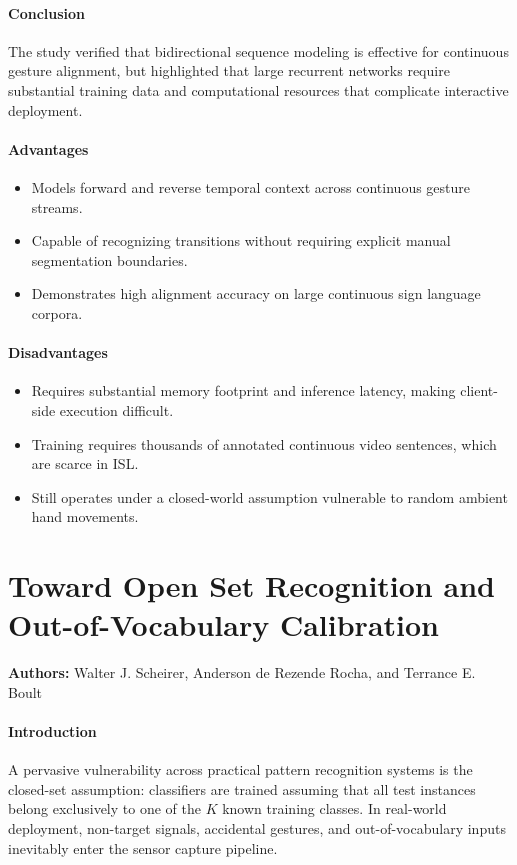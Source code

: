 \paragraph{Conclusion}
The study verified that bidirectional sequence modeling is effective for continuous gesture alignment, but highlighted that large recurrent networks require substantial training data and computational resources that complicate interactive deployment.

\paragraph{Advantages}
\begin{itemize}
    \item Models forward and reverse temporal context across continuous gesture streams.
    \item Capable of recognizing transitions without requiring explicit manual segmentation boundaries.
    \item Demonstrates high alignment accuracy on large continuous sign language corpora.
\end{itemize}

\paragraph{Disadvantages}
\begin{itemize}
    \item Requires substantial memory footprint and inference latency, making client-side execution difficult.
    \item Training requires thousands of annotated continuous video sentences, which are scarce in ISL.
    \item Still operates under a closed-world assumption vulnerable to random ambient hand movements.
\end{itemize}

\section{Toward Open Set Recognition and Out-of-Vocabulary Calibration}
\textbf{Authors:} Walter J. Scheirer, Anderson de Rezende Rocha, and Terrance E. Boult \cite{11,12}

\paragraph{Introduction}
A pervasive vulnerability across practical pattern recognition systems is the closed-set assumption: classifiers are trained assuming that all test instances belong exclusively to one of the $K$ known training classes. In real-world deployment, non-target signals, accidental gestures, and out-of-vocabulary inputs inevitably enter the sensor capture pipeline.


